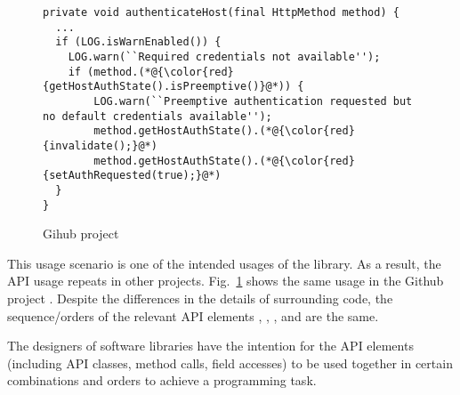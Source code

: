 \begin{figure}[t]
	\centering
\begin{lstlisting}[]
private void authenticateHost(final HttpMethod method) {
  ...
  if (LOG.isWarnEnabled()) {
    LOG.warn(``Required credentials not available'');
    if (method.(*@{\color{red}{getHostAuthState().isPreemptive()}@*)) {
        LOG.warn(``Preemptive authentication requested but no default credentials available'');
        method.getHostAuthState().(*@{\color{red}{invalidate();}@*)
        method.getHostAuthState().(*@{\color{red}{setAuthRequested(true);}@*)
  }
}
\end{lstlisting}
        \vspace{-12pt}
        \caption{Gihub project }
        \vspace{-6pt}
        \label{fig:example2}
\end{figure}

This usage scenario is one of the intended usages of the
 library. As a result, the API usage repeats in other
projects. Fig.~\ref{fig:example2} shows the same usage in the Github
project . Despite the differences in the details of
surrounding code, the sequence/orders of the relevant API elements
, , , and
 are the same.


\begin{Observation}
The designers of software libraries have the intention for the API
elements (including API classes, method calls, field accesses) to be
used together in certain combinations and orders to achieve a
programming task.
\end{Observation}

